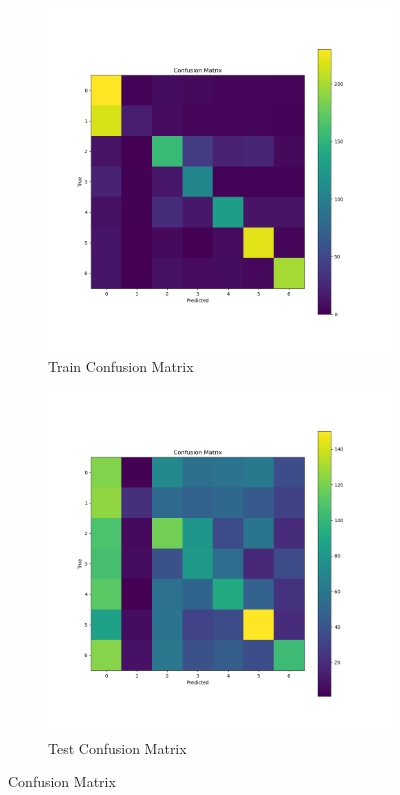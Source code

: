 \documentclass{article}
\begin{document}
\begin{figure}[h!]
    \centering
    \begin{subfigure}{0.45\textwidth}
        \includegraphics[width=\textwidth]{./pic/confusion_matrix_1641.png}
        \caption{Train Confusion Matrix}
        \label{fig:confusion_matrix_train}
    \end{subfigure}
    \hfill %
    \begin{subfigure}{0.45\textwidth}
        \includegraphics[width=\textwidth]{./pic/confusion_matrix_2723.png}
        \caption{Test Confusion Matrix}
        \label{fig:confusion_matrix_test}
    \end{subfigure}
    \caption{Confusion Matrix}
\end{figure}
\end{document}
